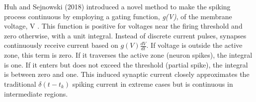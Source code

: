 



\noindent Huh and Sejnowski (2018) introduced a novel method to make the spiking process continuous by employing a gating function, \textit{g(V)}, of the membrane voltage, V \cite{huh2018gradient}. This function is positive for voltages near the firing threshold and zero otherwise, with a unit integral. Instead of discrete current pulses, synapses continuously receive current based on $g(V)\frac{dV}{dt}$. If voltage is outside the active zone, this term is zero. If it traverses the active zone (neuron spikes), the integral is one. If it enters but does not exceed the threshold (partial spike), the integral is between zero and one. This induced synaptic current closely approximates the traditional  $\delta (t - t_k)$ spiking current in extreme cases but is continuous in intermediate regions. \\


